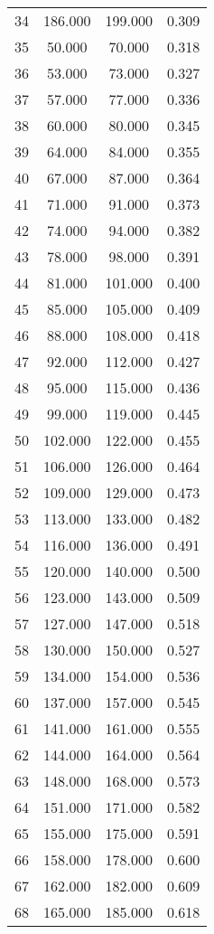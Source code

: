 \begin{tabular}{cccc}
  34 & 186.000 & 199.000 & 0.309 \\ 
  35 & 50.000 & 70.000 & 0.318 \\ 
  36 & 53.000 & 73.000 & 0.327 \\ 
  37 & 57.000 & 77.000 & 0.336 \\ 
  38 & 60.000 & 80.000 & 0.345 \\ 
  39 & 64.000 & 84.000 & 0.355 \\ 
  40 & 67.000 & 87.000 & 0.364 \\ 
  41 & 71.000 & 91.000 & 0.373 \\ 
  42 & 74.000 & 94.000 & 0.382 \\ 
  43 & 78.000 & 98.000 & 0.391 \\ 
  44 & 81.000 & 101.000 & 0.400 \\ 
  45 & 85.000 & 105.000 & 0.409 \\ 
  46 & 88.000 & 108.000 & 0.418 \\ 
  47 & 92.000 & 112.000 & 0.427 \\ 
  48 & 95.000 & 115.000 & 0.436 \\ 
  49 & 99.000 & 119.000 & 0.445 \\ 
  50 & 102.000 & 122.000 & 0.455 \\ 
  51 & 106.000 & 126.000 & 0.464 \\ 
  52 & 109.000 & 129.000 & 0.473 \\ 
  53 & 113.000 & 133.000 & 0.482 \\ 
  54 & 116.000 & 136.000 & 0.491 \\ 
  55 & 120.000 & 140.000 & 0.500 \\ 
  56 & 123.000 & 143.000 & 0.509 \\ 
  57 & 127.000 & 147.000 & 0.518 \\ 
  58 & 130.000 & 150.000 & 0.527 \\ 
  59 & 134.000 & 154.000 & 0.536 \\ 
  60 & 137.000 & 157.000 & 0.545 \\ 
  61 & 141.000 & 161.000 & 0.555 \\ 
  62 & 144.000 & 164.000 & 0.564 \\ 
  63 & 148.000 & 168.000 & 0.573 \\ 
  64 & 151.000 & 171.000 & 0.582 \\ 
  65 & 155.000 & 175.000 & 0.591 \\ 
  66 & 158.000 & 178.000 & 0.600 \\ 
  67 & 162.000 & 182.000 & 0.609 \\ 
  68 & 165.000 & 185.000 & 0.618 \\ 

\end{tabular}
